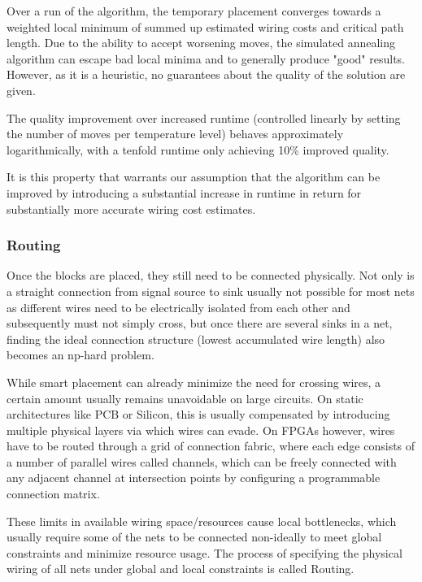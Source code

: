 Over a run of the algorithm, the temporary placement converges towards a weighted local minimum of summed up estimated wiring costs and critical path length. Due to the ability to accept worsening moves, the simulated annealing algorithm can escape bad local minima and to generally produce "good" results. However, as it is a heuristic, no guarantees about the quality of the solution are given.

The quality improvement over increased runtime (controlled linearly by setting the number of moves per temperature level) behaves approximately logarithmically, with a tenfold runtime only achieving 10\% improved quality.\cite{vtr8}

It is this property that warrants our assumption that the algorithm can be improved by introducing a substantial increase in runtime in return for substantially more accurate wiring cost estimates.

\subsubsection{Routing}

Once the blocks are placed, they still need to be connected physically. Not only is a straight connection from signal source to sink usually not possible for most nets as different wires need to be electrically isolated from each other and subsequently must not simply cross, but once there are several sinks in a net, finding the ideal connection structure (lowest accumulated wire length) also becomes an np-hard problem\cite{rsmt-complexity}.

While smart placement can already minimize the need for crossing wires, a certain amount usually remains unavoidable on large circuits. On static architectures like \gls{PCB} or Silicon, this is usually compensated by introducing multiple physical layers via which wires can evade. On \glspl{FPGA} however, wires have to be routed through a grid of connection fabric, where each edge consists of a number of parallel wires called channels, which can be freely connected with any adjacent channel at intersection points by configuring a programmable connection matrix.

These limits in available wiring space/resources cause local bottlenecks, which usually require some of the nets to be connected non-ideally to meet global constraints and minimize resource usage. The process of specifying the physical wiring of all nets under global and local constraints is called Routing.

